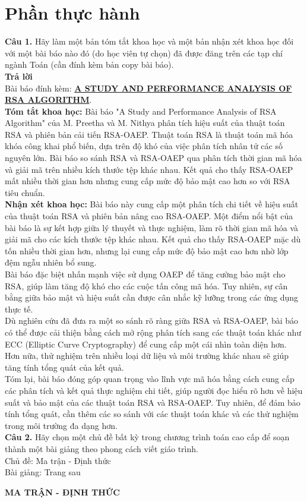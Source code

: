 \section{Phần thực hành}
{\bf Câu 1.} Hãy làm một bản tóm tắt khoa học và một bản nhận xét khoa
học đối với một bài báo nào đó (do học viên tự chọn) đã được đăng trên các
tạp chí ngành Toán (cần đính kèm bản copy bài báo).\\
{\bf Trả lời}\\
Bài báo đính kèm: \hyperref[appendix:a]{\bf A STUDY AND PERFORMANCE ANALYSIS OF RSA ALGORITHM}.\\
{\bf Tóm tắt khoa học:} Bài báo "A Study and Performance Analysis of RSA Algorithm" của M. Preetha và M. Nithya phân tích hiệu suất của thuật toán RSA và phiên bản cải tiến RSA-OAEP.
Thuật toán RSA là thuật toán mã hóa khóa công khai phổ biến, dựa trên độ khó của việc phân tích nhân tử các số nguyên lớn.
Bài báo so sánh RSA và RSA-OAEP qua phân tích thời gian mã hóa và giải mã trên nhiều kích thước tệp khác nhau.
Kết quả cho thấy RSA-OAEP mất nhiều thời gian hơn nhưng cung cấp mức độ bảo mật cao hơn so với RSA tiêu chuẩn.\\
{\bf Nhận xét khoa học:} Bài báo này cung cấp một phân tích chi tiết về hiệu suất của thuật toán RSA và phiên bản nâng cao RSA-OAEP. Một điểm nổi bật của bài báo là sự kết hợp giữa lý thuyết và thực nghiệm, làm rõ thời gian mã hóa và giải mã cho các kích thước tệp khác nhau. Kết quả cho thấy RSA-OAEP mặc dù tốn nhiều thời gian hơn, nhưng lại cung cấp mức độ bảo mật cao hơn nhờ lớp đệm ngẫu nhiên bổ sung.\\
Bài báo đặc biệt nhấn mạnh việc sử dụng OAEP để tăng cường bảo mật cho RSA, giúp làm tăng độ khó cho các cuộc tấn công mã hóa. Tuy nhiên, sự cân bằng giữa bảo mật và hiệu suất cần được cân nhắc kỹ lưỡng trong các ứng dụng thực tế.\\
Dù nghiên cứu đã đưa ra một so sánh rõ ràng giữa RSA và RSA-OAEP, bài báo có thể được cải thiện bằng cách mở rộng phân tích sang các thuật toán khác như ECC (Elliptic Curve Cryptography) để cung cấp một cái nhìn toàn diện hơn. Hơn nữa, thử nghiệm trên nhiều loại dữ liệu và môi trường khác nhau sẽ giúp tăng tính tổng quát của kết quả.\\
Tóm lại, bài báo đóng góp quan trọng vào lĩnh vực mã hóa bằng cách cung cấp các phân tích và kết quả thực nghiệm chi tiết, giúp người đọc hiểu rõ hơn về hiệu suất và bảo mật của các thuật toán RSA và RSA-OAEP. Tuy nhiên, để đảm bảo tính tổng quát, cần thêm các so sánh với các thuật toán khác và các thử nghiệm trong môi trường đa dạng hơn.\\
{\bf Câu 2. } Hãy chọn một chủ đề bất kỳ trong chương trình toán cao cấp
để soạn thành một bài giảng theo phong cách viết giáo trình.\\
Chủ đề: Ma trận - Định thức\\
Bài giảng: Trang sau
\newpage
\begin{center}
    \huge {\bf MA TRẬN - ĐỊNH THỨC}
\end{center}

